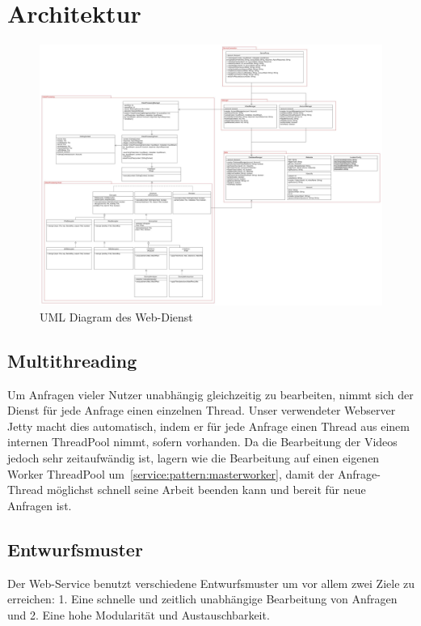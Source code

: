 \section{Architektur}

\begin{figure}[ht]
	\centering
\includegraphics[width=1\textwidth]{./resources/Diagramme/Webservice/UMLSERVERPCC.jpg}
\caption{UML Diagram des Web-Dienst}
	\label{service:fig:modules_overview}
\end{figure}

\subsection{Multithreading}
Um Anfragen vieler Nutzer unabhängig gleichzeitig zu bearbeiten, nimmt sich der Dienst für jede Anfrage einen einzelnen Thread. Unser verwendeter Webserver Jetty macht dies automatisch, indem er für jede Anfrage einen Thread aus einem internen ThreadPool nimmt, sofern vorhanden.\newline
Da die Bearbeitung der Videos jedoch sehr zeitaufwändig ist, lagern wie die Bearbeitung auf einen eigenen Worker ThreadPool um~\eqref{service:pattern:masterworker}, damit der Anfrage-Thread möglichst schnell seine Arbeit beenden kann und bereit für neue Anfragen ist. 

\subsection{Entwurfsmuster} \label{service:pattern}
Der Web-Service benutzt verschiedene Entwurfsmuster um vor allem zwei Ziele zu erreichen: 1. Eine schnelle und zeitlich unabhängige Bearbeitung von Anfragen und 2. Eine hohe Modularität und Austauschbarkeit.

